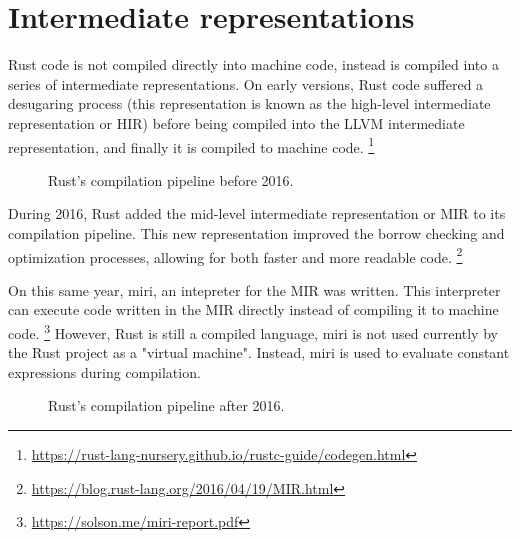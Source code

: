 \section{Intermediate representations}
Rust code is not compiled directly into machine code, instead is compiled into a series of intermediate representations. On early versions, Rust code suffered a desugaring process (this representation is known as the high-level intermediate representation or HIR) before being compiled into the LLVM intermediate representation, and finally it is compiled to machine code. \footnote{\url{https://rust-lang-nursery.github.io/rustc-guide/codegen.html}}

\begin{figure}[ht]
  \centering
  \caption{Rust's compilation pipeline before 2016.}
\end{figure}

During 2016, Rust added the mid-level intermediate representation or MIR to its compilation pipeline. This new representation improved the borrow checking and optimization processes, allowing for both faster and more readable code. \footnote{\url{https://blog.rust-lang.org/2016/04/19/MIR.html}}

On this same year, miri, an intepreter for the MIR was written. This interpreter can execute code written in the MIR directly instead of compiling it to machine code. \footnote{\url{https://solson.me/miri-report.pdf}} However, Rust is still a compiled language, miri is not used currently by the Rust project as a "virtual machine". Instead, miri is used to evaluate constant expressions during compilation.

\begin{figure}[ht]
  \centering
  \caption{Rust's compilation pipeline after 2016.}
\end{figure}
